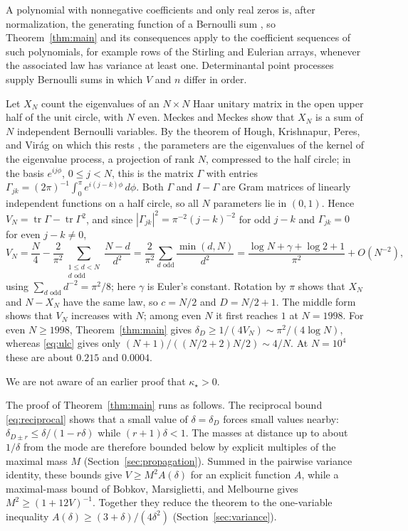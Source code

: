 \documentclass[ECP,preprint]{ejpecp}
\begin{document}
A polynomial with nonnegative coefficients and only real zeros is, after
normalization, the generating function of a Bernoulli sum
\cite[Proposition~1]{pitman1997}, so Theorem~\ref{thm:main} and its
consequences apply to the coefficient sequences of such polynomials, for
example rows of the Stirling and Eulerian arrays, whenever the associated
law has variance at least one. Determinantal point processes supply
Bernoulli sums in which $V$ and $n$ differ in order.

\begin{example}\label{ex:cue}
  Let $X_N$ count the eigenvalues of an $N\times N$ Haar unitary matrix in
  the open upper half of the unit circle, with $N$ even. Meckes and Meckes
  \cite[Proposition~3(1)]{meckesmeckes2017} show that $X_N$ is a sum of $N$
  independent Bernoulli variables. By the theorem of Hough, Krishnapur, Peres,
  and Vir\'ag on which this rests \cite[Theorem~7]{houghkrishnapurperesvirag2006},
  the parameters are the eigenvalues of the kernel of the eigenvalue process,
  a projection of rank $N$, compressed to the half circle; in the basis
  $e^{ij\phi}$, $0\leq j<N$, this is the matrix $\Gamma$ with entries
  $\Gamma_{jk}=(2\pi)^{-1}\int_0^\pi e^{i(j-k)\phi}\,d\phi$. Both
  $\Gamma$ and $I-\Gamma$ are Gram matrices of linearly independent functions
  on a half circle, so all $N$ parameters lie in $(0,1)$. Hence
  $V_N=\operatorname{tr}\Gamma-\operatorname{tr}\Gamma^2$, and since
  $|\Gamma_{jk}|^2=\pi^{-2}(j-k)^{-2}$ for odd $j-k$ and $\Gamma_{jk}=0$ for
  even $j-k\neq0$,
  \[
    V_N=\frac N4-\frac2{\pi^2}\sum_{\substack{1\leq d<N\\ d\text{ odd}}}
    \frac{N-d}{d^2}
    =\frac2{\pi^2}\sum_{d\text{ odd}}\frac{\min(d,N)}{d^2}
    =\frac{\log N+\gamma+\log2+1}{\pi^2}+O(N^{-2}),
  \]
  using $\sum_{d\text{ odd}}d^{-2}=\pi^2/8$; here $\gamma$ is Euler's
  constant. Rotation by $\pi$ shows that
  $X_N$ and $N-X_N$ have the same law, so $c=N/2$ and $D=N/2+1$. The middle
  form shows that $V_N$ increases with $N$; among even $N$ it first reaches
  $1$ at $N=1998$. For even $N\geq1998$, Theorem~\ref{thm:main} gives
  $\delta_D\geq1/(4V_N)\sim\pi^2/(4\log N)$, whereas \eqref{eq:ulc} gives
  only $(N+1)/((N/2+2)N/2)\sim4/N$. At $N=10^4$ these are about $0.215$ and
  $0.0004$.
\end{example}

We are not aware of an earlier proof that $\kappa_\star>0$.

The proof of Theorem~\ref{thm:main} runs as follows. The reciprocal bound
\eqref{eq:reciprocal} shows that a small value of $\delta=\delta_D$ forces
small values nearby:
$\delta_{D\pm r}\leq\delta/(1-r\delta)$ while $(r+1)\delta<1$. The masses at distance up to about
$1/\delta$ from the mode are therefore bounded below by explicit multiples of
the maximal mass $M$ (Section~\ref{sec:propagation}). Summed in the pairwise
variance identity, these bounds give $V\geq M^2A(\delta)$ for an explicit
function $A$, while a maximal-mass bound of Bobkov, Marsiglietti, and
Melbourne gives $M^2\geq(1+12V)^{-1}$. Together they reduce the theorem to
the one-variable inequality $A(\delta)\geq(3+\delta)/(4\delta^2)$
(Section~\ref{sec:variance}).
\end{document}
